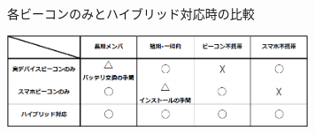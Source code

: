 \begin{table}[tbh]
  \centering
  \caption{各ビーコンのみとハイブリッド対応時の比較}
  \includegraphics[width=9cm]{image/table.png}
  \label{multipleBPM}
\end{table}








